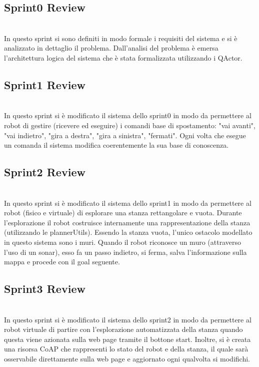 \subsection*{Sprint0 Review }
\date{30/12/2018}\\
In questo sprint si sono definiti in modo formale i requisiti del sistema e si è analizzato in dettaglio il problema. 
Dall'analisi del problema è emersa l'architettura logica del sistema che è stata formalizzata utilizzando i QActor. %

\subsection*{Sprint1 Review}
\date{27/06/2019}\\
In questo sprint si è modificato il sistema dello sprint0 in modo da permettere al robot di gestire (ricevere ed eseguire) i comandi base di spostamento: "vai avanti", "vai indietro", "gira a destra", "gira a sinistra", "fermati".  Ogni volta che esegue un comanda il sistema modifica coerentemente la sua base di conoscenza.

\subsection*{Sprint2 Review}
\date{15/07/2019}\\
In questo sprint si è modificato il sistema dello sprint1 in modo da permettere al robot (fisico e virtuale) di esplorare una stanza rettangolare e vuota. Durante l'esplorazione il robot costruisce internamente una rappresentazione della stanza (utilizzando le plannerUtils). Essendo la stanza vuota, l'unico ostacolo modellato in questo sistema sono i muri. Quando il robot riconosce un muro (attraverso l'uso di un sonar), esso fa un passo indietro, si ferma, salva l'informazione sulla mappa e procede con il goal seguente. 

\subsection*{Sprint3 Review }
\date{11/08/2019}\\
In questo sprint si è modificato il sistema dello sprint2 in modo da permettere al robot virtuale di partire con l'esplorazione automatizzata della stanza quando questa viene azionata sulla web page tramite il bottone start. Inoltre, si è creata una risorsa CoAP che rappresenti lo stato del robot e della stanza, il quale sarà osservabile direttamente sulla web page e aggiornato ogni qualvolta si modifichi.

